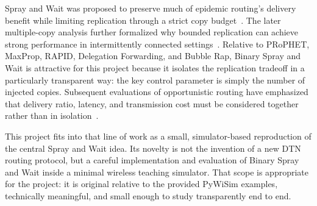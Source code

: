 Spray and Wait was proposed to preserve much of epidemic routing's delivery benefit while limiting replication through a strict copy budget~\cite{spyropoulos2005spraywait}. The later multiple-copy analysis further formalized why bounded replication can achieve strong performance in intermittently connected settings~\cite{spyropoulos2008multiplecopy}. Relative to PRoPHET, MaxProp, RAPID, Delegation Forwarding, and Bubble Rap, Binary Spray and Wait is attractive for this project because it isolates the replication tradeoff in a particularly transparent way: the key control parameter is simply the number of injected copies. Subsequent evaluations of opportunistic routing have emphasized that delivery ratio, latency, and transmission cost must be considered together rather than in isolation~\cite{song2007evaluating,sobin2016survey}.

This project fits into that line of work as a small, simulator-based reproduction of the central Spray and Wait idea. Its novelty is not the invention of a new DTN routing protocol, but a careful implementation and evaluation of Binary Spray and Wait inside a minimal wireless teaching simulator. That scope is appropriate for the project: it is original relative to the provided PyWiSim examples, technically meaningful, and small enough to study transparently end to end.
